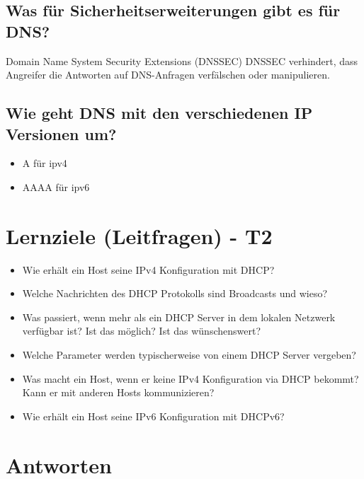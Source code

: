 \subsection*{Was für Sicherheitserweiterungen gibt es für DNS?}
Domain Name System Security Extensions (DNSSEC) DNSSEC verhindert, dass Angreifer die Antworten auf DNS-Anfragen verfälschen oder manipulieren.

\subsection*{Wie geht DNS mit den verschiedenen IP Versionen um?}
\begin{itemize}
    \item A für ipv4
    \item AAAA für ipv6
\end{itemize}


\section{Lernziele (Leitfragen) - T2}
\begin{itemize}
    \item Wie erhält ein Host seine IPv4 Konfiguration mit DHCP?
    \item Welche Nachrichten des DHCP Protokolls sind Broadcasts und wieso?
    \item Was passiert, wenn mehr als ein DHCP Server in dem lokalen Netzwerk verfügbar ist? Ist das möglich? Ist das wünschenswert?
    \item Welche Parameter werden typischerweise von einem DHCP Server vergeben?
    \item Was macht ein Host, wenn er keine IPv4 Konfiguration via DHCP bekommt? Kann er mit anderen Hosts kommunizieren?
    \item Wie erhält ein Host seine IPv6 Konfiguration mit DHCPv6?
\end{itemize}

\section{Antworten}
